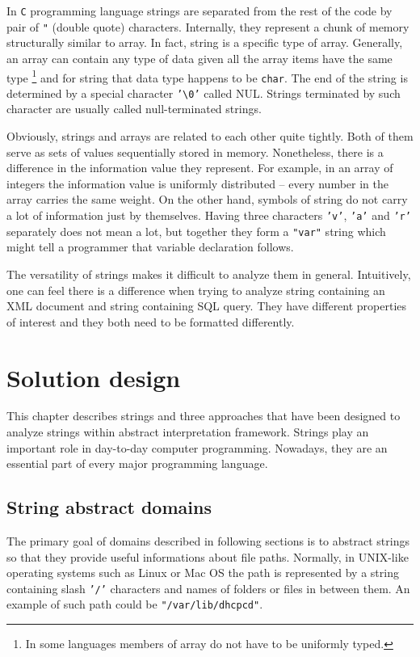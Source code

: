\documentclass[12pt,final,oneside]{fithesis2}
\theoremstyle{definition}
\begin{document}
In \texttt{C} programming language strings are separated from the rest of
the code by pair of \texttt{"} (double quote) characters. Internally,
they represent a chunk of memory structurally similar to array. In fact,
string is a specific type of array. Generally, an array can contain any
type of data given all the array items have the same type \footnote{In some
languages members of array do not have to be uniformly typed.} and for
string that data type happens to be \texttt{char}. The end of the string is
determined by a special character \texttt{'\textbackslash0'} called NUL.
Strings terminated by such character are usually called null-terminated
strings.

Obviously, strings and arrays are related to each other quite tightly.
Both of them serve as sets of values sequentially stored in memory.
Nonetheless, there is a difference in the information value they represent.
For example, in an array of integers the information value is uniformly
distributed -- every number in the array carries the same weight. On the
other hand, symbols of string do not carry a lot of information just by
themselves. Having three characters \texttt{'v'}, \texttt{'a'} and
\texttt{'r'} separately does not mean a lot, but together they form
a \texttt{"var"} string which might tell a programmer that variable
declaration follows.

The versatility of strings makes it difficult to analyze them in general.
Intuitively, one can feel there is a difference when trying to analyze
string containing an XML document and string containing SQL query. They
have different properties of interest and they both need to be formatted
differently.


\chapter{Solution design}
\label{chap:design}

This chapter describes strings and three approaches that have been designed
to analyze strings within abstract interpretation framework. Strings play
an important role in day-to-day computer programming. Nowadays, they are
an essential part of every major programming language.


\section{String abstract domains}

The primary goal of domains described in following sections is to
abstract strings so that they provide useful informations about file
paths. Normally, in UNIX-like operating systems such as Linux or Mac OS
the path is represented by a string containing slash \texttt{'/'} characters
and names of folders or files in between them. An example of such path could
be \texttt{"/var/lib/dhcpcd"}.
\end{document}
